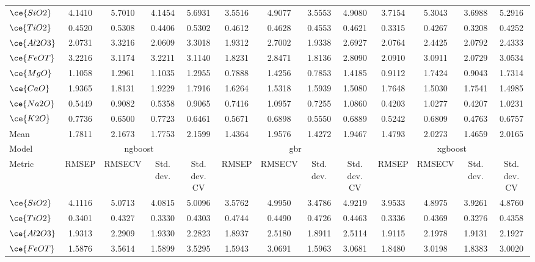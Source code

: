 \begin{table*}[]
{\begin{tabular}{l|cccc|cccc|cccc}
\hline
$\ce{SiO2}$ & 4.1410 & 5.7010 & 4.1454 & 5.6931 & 3.5516 & 4.9077 & 3.5553 & 4.9080 & 3.7154 & 5.3043 & 3.6988 & 5.2916 \\
$\ce{TiO2}$ & 0.4520 & 0.5308 & 0.4406 & 0.5302 & 0.4612 & 0.4628 & 0.4553 & 0.4621 & 0.3315 & 0.4267 & 0.3208 & 0.4252 \\
$\ce{Al2O3}$ & 2.0731 & 3.3216 & 2.0609 & 3.3018 & 1.9312 & 2.7002 & 1.9338 & 2.6927 & 2.0764 & 2.4425 & 2.0792 & 2.4333 \\
$\ce{FeOT}$ & 3.2216 & 3.1174 & 3.2211 & 3.1140 & 1.8231 & 2.8471 & 1.8136 & 2.8090 & 2.0910 & 3.0911 & 2.0729 & 3.0534 \\
$\ce{MgO}$ & 1.1058 & 1.2961 & 1.1035 & 1.2955 & 0.7888 & 1.4256 & 0.7853 & 1.4185 & 0.9112 & 1.7424 & 0.9043 & 1.7314 \\
$\ce{CaO}$ & 1.9365 & 1.8131 & 1.9229 & 1.7916 & 1.6264 & 1.5318 & 1.5939 & 1.5080 & 1.7648 & 1.5030 & 1.7541 & 1.4985 \\
$\ce{Na2O}$ & 0.5449 & 0.9082 & 0.5358 & 0.9065 & 0.7416 & 1.0957 & 0.7255 & 1.0860 & 0.4203 & 1.0277 & 0.4207 & 1.0231 \\
$\ce{K2O}$ & 0.7736 & 0.6500 & 0.7723 & 0.6461 & 0.5671 & 0.6898 & 0.5550 & 0.6889 & 0.5242 & 0.6809 & 0.4763 & 0.6757 \\
\hline
Mean & 1.7811 & 2.1673 & 1.7753 & 2.1599 & 1.4364 & 1.9576 & 1.4272 & 1.9467 & 1.4793 & 2.0273 & 1.4659 & 2.0165 \\
\hline
Model & \multicolumn{4}{c}{\gls{ngboost}} & \multicolumn{4}{c}{\gls{gbr}} & \multicolumn{4}{c}{\gls{xgboost}} \\
Metric & \multicolumn{1}{c}{RMSEP} & \multicolumn{1}{c}{RMSECV} & \multicolumn{1}{c}{Std. dev.} & \multicolumn{1}{c}{Std. dev. CV} & \multicolumn{1}{c}{RMSEP} & \multicolumn{1}{c}{RMSECV} & \multicolumn{1}{c}{Std. dev.} & \multicolumn{1}{c}{Std. dev. CV} & \multicolumn{1}{c}{RMSEP} & \multicolumn{1}{c}{RMSECV} & \multicolumn{1}{c}{Std. dev.} & \multicolumn{1}{c}{Std. dev. CV} \\
\hline
$\ce{SiO2}$ & 4.1116 & 5.0713 & 4.0815 & 5.0096 & 3.5762 & 4.9950 & 3.4786 & 4.9219 & 3.9533 & 4.8975 & 3.9261 & 4.8760 \\
$\ce{TiO2}$ & 0.3401 & 0.4327 & 0.3330 & 0.4303 & 0.4744 & 0.4490 & 0.4726 & 0.4463 & 0.3336 & 0.4369 & 0.3276 & 0.4358 \\
$\ce{Al2O3}$ & 1.9313 & 2.2909 & 1.9330 & 2.2823 & 1.8937 & 2.5180 & 1.8911 & 2.5114 & 1.9115 & 2.1978 & 1.9131 & 2.1927 \\
$\ce{FeOT}$ & 1.5876 & 3.5614 & 1.5899 & 3.5295 & 1.5943 & 3.0691 & 1.5963 & 3.0681 & 1.8480 & 3.0198 & 1.8383 & 3.0020 \\

\end{tabular}}
\end{table*}
